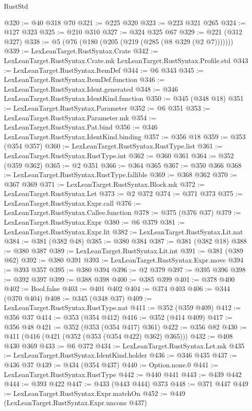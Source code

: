 \begin{lexlean}{RustStd}
\begin{coremodule}
@320 := @40 @318 @70
@321 := @225 @320
@323 := @223 @321 @265
@324 := @127 @323
@325 := @210 @310
@327 := @324 @325 @67
@329 := @221 (@312 @327)
@338 := @5 (@76 (@180 (@205 (@219 (@285 (@8 @329 (@2 @7)))))))
@339 := LexLeanTarget.RustSyntax.Crate
@342 := LexLeanTarget.RustSyntax.Crate.mk LexLeanTarget.RustSyntax.Profile.std
@343 := LexLeanTarget.RustSyntax.ItemDef
@344 := @6 @343
@345 := LexLeanTarget.RustSyntax.ItemDef.function
@346 := LexLeanTarget.RustSyntax.Ident.generated
@348 := @346 LexLeanTarget.RustSyntax.IdentKind.function
@350 := @345 (@348 @18)
@351 := LexLeanTarget.RustSyntax.Parameter
@352 := @6 @351
@353 := LexLeanTarget.RustSyntax.Parameter.mk
@354 := LexLeanTarget.RustSyntax.Pat.bind
@356 := @346 LexLeanTarget.RustSyntax.IdentKind.binding
@357 := @356 @18
@359 := @353 (@354 @357)
@360 := LexLeanTarget.RustSyntax.RustType.list
@361 := LexLeanTarget.RustSyntax.RustType.int
@362 := @360 @361
@364 := @352 (@359 @362)
@365 := @2 @351
@366 := @364 @365
@367 := @350 @366
@368 := LexLeanTarget.RustSyntax.RustType.fallible
@369 := @368 @362
@370 := @367 @369
@371 := LexLeanTarget.RustSyntax.Block.mk
@372 := LexLeanTarget.RustSyntax.Let
@373 := @2 @372
@374 := @371 @373
@375 := LexLeanTarget.RustSyntax.Expr.call
@376 := LexLeanTarget.RustSyntax.Callee.function
@378 := @375 (@376 @37)
@379 := LexLeanTarget.RustSyntax.Expr
@380 := @6 @379
@381 := LexLeanTarget.RustSyntax.Expr.lit
@382 := LexLeanTarget.RustSyntax.Lit.nat
@384 := @381 (@382 @48)
@385 := @380 @384
@387 := @381 (@382 @18)
@388 := @380 @387
@389 := LexLeanTarget.RustSyntax.Lit.int
@391 := @381 (@389 @62)
@392 := @380 @391
@393 := LexLeanTarget.RustSyntax.Expr.move
@394 := @393 @357
@395 := @380 @394
@396 := @2 @379
@397 := @395 @396
@398 := @392 @397
@399 := @388 @398
@400 := @385 @399
@401 := @378 @400
@402 := Bool.false
@403 := @401 @402
@404 := @374 @403
@406 := @344 (@370 @404)
@408 := @345 (@348 @37)
@409 := LexLeanTarget.RustSyntax.RustType.nat
@411 := @352 (@359 @409)
@412 := @356 @37
@414 := @353 (@354 @412)
@416 := @352 (@414 @409)
@417 := @356 @48
@421 := @352 (@353 (@354 @417) @361)
@422 := @356 @82
@430 := @411 (@416 (@421 (@352 (@353 (@354 @422) @362) @365)))
@432 := @408 @430 @369
@433 := @6 @372
@434 := LexLeanTarget.RustSyntax.Let.mk
@435 := LexLeanTarget.RustSyntax.IdentKind.holder
@436 := @346 @435
@437 := @436 @37
@439 := @434 (@354 @437)
@440 := Option.none.{0}
@441 := LexLeanTarget.RustSyntax.RustType
@442 := @440 @441
@443 := @439 @442
@444 := @393 @422
@447 := @433 (@443 @444) @373
@448 := @371 @447
@449 := LexLeanTarget.RustSyntax.Expr.matchOn
@452 := @449 (LexLeanTarget.RustSyntax.Expr.uncons @437)

\end{coremodule}
\end{lexlean}
